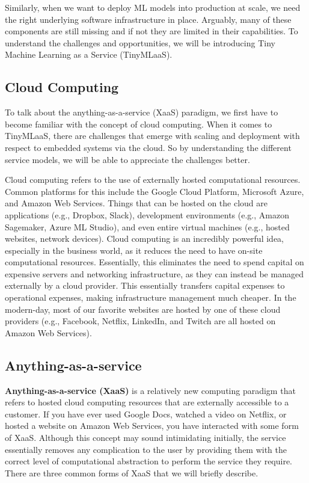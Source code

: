 {{{{{Similarly, when we want to deploy ML models into production at scale, we need the right underlying software infrastructure in place. Arguably, many of these components are still missing and if not they are limited in their capabilities. To understand the challenges and opportunities, we will be introducing Tiny Machine Learning as a Service (TinyMLaaS).

\subsection{Cloud Computing}

To talk about the anything-as-a-service (XaaS) paradigm, we first have to become familiar with the concept of cloud computing. When it comes to TinyMLaaS, there are challenges that emerge with scaling and deployment with respect to embedded systems via the cloud. So by understanding the different service models, we will be able to appreciate the challenges better.

Cloud computing refers to the use of externally hosted computational resources. Common platforms for this include the Google Cloud Platform, Microsoft Azure, and Amazon Web Services. Things that can be hosted on the cloud are applications (e.g., Dropbox, Slack), development environments (e.g., Amazon Sagemaker, Azure ML Studio), and even entire virtual machines (e.g., hosted websites, network devices). Cloud computing is an incredibly powerful idea, especially in the business world, as it reduces the need to have on-site computational resources. Essentially, this eliminates the need to spend capital on expensive servers and networking infrastructure, as they can instead be managed externally by a cloud provider. This essentially transfers capital expenses to operational expenses, making infrastructure management much cheaper. In the modern-day, most of our favorite websites are hosted by one of these cloud providers (e.g., Facebook, Netflix, LinkedIn, and Twitch are all hosted on Amazon Web Services).

\subsection{Anything-as-a-service}

\textbf{Anything-as-a-service (XaaS)} is a relatively new computing paradigm that refers to hosted cloud computing resources that are externally accessible to a customer. If you have ever used Google Docs, watched a video on Netflix, or hosted a website on Amazon Web Services, you have interacted with some form of XaaS. Although this concept may sound intimidating initially, the service essentially removes any complication to the user by providing them with the correct level of computational abstraction to perform the service they require. There are three common forms of XaaS that we will briefly describe.

}}}}}
